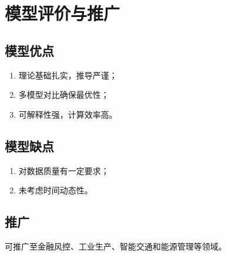\section{模型评价与推广}
\subsection{模型优点}
\begin{enumerate}
    \item 理论基础扎实，推导严谨；
    \item 多模型对比确保最优性；
    \item 可解释性强，计算效率高。
\end{enumerate}

\subsection{模型缺点}
\begin{enumerate}
    \item 对数据质量有一定要求；
    \item 未考虑时间动态性。
\end{enumerate}

\subsection{推广}
可推广至金融风控、工业生产、智能交通和能源管理等领域。
